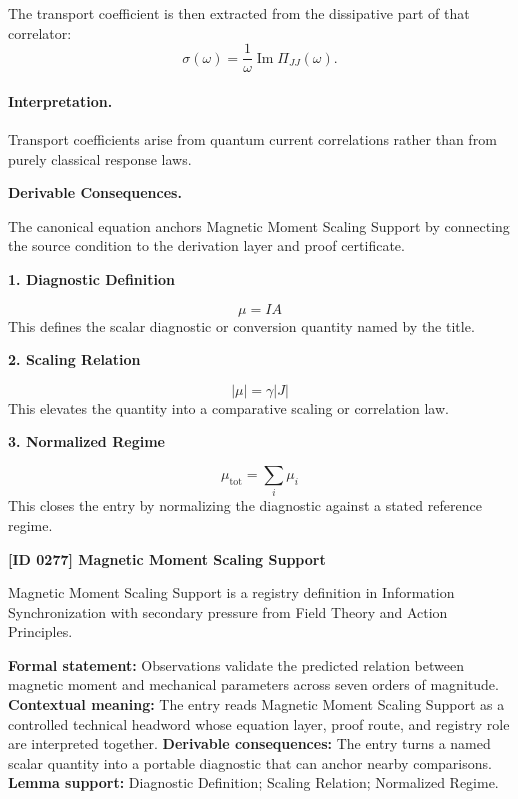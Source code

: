 The transport coefficient is then extracted from the dissipative part of that correlator:
\begin{equation}
\boxed{
\sigma(\omega)
=
\frac{1}{\omega}
\operatorname{Im}\Pi_{JJ}(\omega).
}
\end{equation}

\paragraph{Interpretation.}
Transport coefficients arise from quantum current correlations rather than from purely classical response laws.

\par\vspace{0.35em}
\noindent\textbf{Derivable Consequences.}\quad
\begingroup
\footnotesize
\raggedright
The canonical equation anchors Magnetic Moment Scaling Support by connecting the source condition to the derivation layer and proof certificate.
\par\endgroup

\noindent\textbf{1. Diagnostic Definition}\par
\[
\mu=IA
\]
\noindent This defines the scalar diagnostic or conversion quantity named by the title.\par
\noindent\textbf{2. Scaling Relation}\par
\[
|\mu|=\gamma |J|
\]
\noindent This elevates the quantity into a comparative scaling or correlation law.\par
\noindent\textbf{3. Normalized Regime}\par
\[
\mu_{\mathrm{tot}}=\sum_i\mu_i
\]
\noindent This closes the entry by normalizing the diagnostic against a stated reference regime.\par

\clearpage
\noindent\textbf{[ID 0277] Magnetic Moment Scaling Support}\par
\vspace{0.35em}
\begingroup\small
{}
Magnetic Moment Scaling Support is a registry definition in Information Synchronization with secondary pressure from Field Theory and Action Principles.

\begingroup\footnotesize\setlength{\emergencystretch}{3em}\sloppy
\textbf{Formal statement:} Observations validate the predicted relation between magnetic moment and mechanical parameters across seven orders of magnitude. \textbf{Contextual meaning:} The entry reads Magnetic Moment Scaling Support as a controlled technical headword whose equation layer, proof route, and registry role are interpreted together. \textbf{Derivable consequences:} The entry turns a named scalar quantity into a portable diagnostic that can anchor nearby comparisons. \textbf{Lemma support:} Diagnostic Definition; Scaling Relation; Normalized Regime.\par
\endgroup

